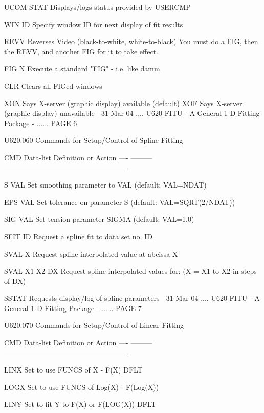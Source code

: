    UCOM STAT        Displays/logs status provided by USERCMP
 
   WIN  ID          Specify window ID for next display of fit results
 
   REVV             Reverses Video (black-to-white, white-to-black)
                    You must do a FIG, then the REVV, and another FIG
                    for it to take effect.
 
   FIG  N           Execute a standard "FIG" - i.e. like damm
 
   CLR              Clears all FIGed windows
 
   XON              Says X-server (graphic display)   available (default)
   XOF              Says X-server (graphic display) unavailable
    
   31-Mar-04 .... U620  FITU - A General 1-D Fitting Package - ...... PAGE   6
 
 
   U620.060  Commands for Setup/Control of Spline Fitting
 
   CMD  Data-list   Definition or Action
   ---- ---------   ----------------------------------------------------
 
   S    VAL         Set smoothing parameter to VAL (default: VAL=NDAT)
 
   EPS  VAL         Set tolerance on parameter S   (default: VAL=SQRT(2/NDAT))
 
   SIG  VAL         Set tension parameter SIGMA    (default: VAL=1.0)
 
   SFIT ID          Request a spline fit to data set no. ID
 
   SVAL X           Request spline interpolated value at abcissa X
 
   SVAL X1 X2 DX    Request spline interpolated values for:
                    (X = X1 to X2 in steps of DX)
 
   SSTAT            Requests display/log of spline parameters
    
   31-Mar-04 .... U620  FITU - A General 1-D Fitting Package - ...... PAGE   7
 
 
   U620.070  Commands for Setup/Control of Linear Fitting
 
   CMD  Data-list   Definition or Action
   ---- ---------   ----------------------------------------------------
 
   LINX             Set to use FUNCS of X - F(X)      DFLT
 
   LOGX             Set to use FUNCS of Log(X) - F(Log(X))
 
   LINY             Set to fit Y to F(X) or F(LOG(X)) DFLT
 
